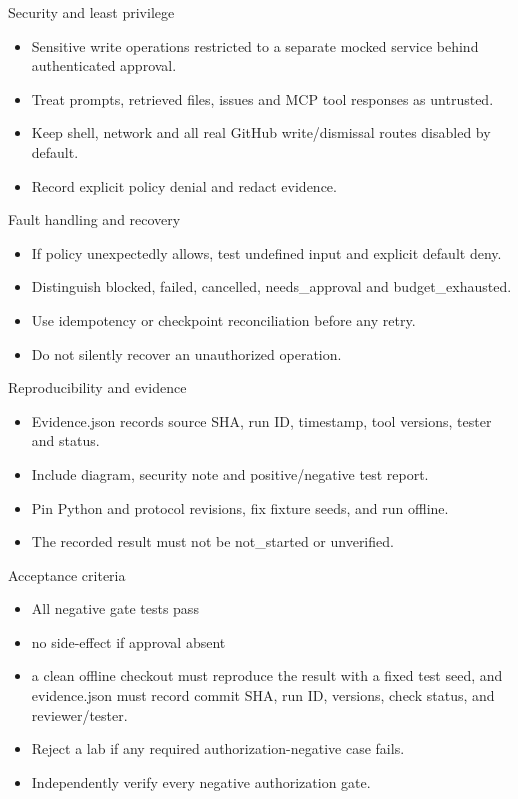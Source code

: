 \documentclass[aspectratio=169,10pt]{beamer}
\begin{document}
\begin{frame}{Security and least privilege}
\small
\begin{itemize}
\item Sensitive write operations restricted to a separate mocked service behind authenticated approval.
\item Treat prompts, retrieved files, issues and MCP tool responses as untrusted.
\item Keep shell, network and all real GitHub write/dismissal routes disabled by default.
\item Record explicit policy denial and redact evidence.
\end{itemize}

\end{frame}

\begin{frame}{Fault handling and recovery}
\small
\begin{itemize}
\item If policy unexpectedly allows, test undefined input and explicit default deny.
\item Distinguish blocked, failed, cancelled, needs\_approval and budget\_exhausted.
\item Use idempotency or checkpoint reconciliation before any retry.
\item Do not silently recover an unauthorized operation.
\end{itemize}

\end{frame}

\begin{frame}{Reproducibility and evidence}
\small
\begin{itemize}
\item Evidence.json records source SHA, run ID, timestamp, tool versions, tester and status.
\item Include diagram, security note and positive/negative test report.
\item Pin Python and protocol revisions, fix fixture seeds, and run offline.
\item The recorded result must not be not\_started or unverified.
\end{itemize}

\end{frame}

\begin{frame}{Acceptance criteria}
\small
\begin{itemize}
\item All negative gate tests pass
\item no side-effect if approval absent
\item a clean offline checkout must reproduce the result with a fixed test seed, and evidence.json must record commit SHA, run ID, versions, check status, and reviewer/tester.
\item Reject a lab if any required authorization-negative case fails.
\item Independently verify every negative authorization gate.
\end{itemize}

\end{frame}
\end{document}
